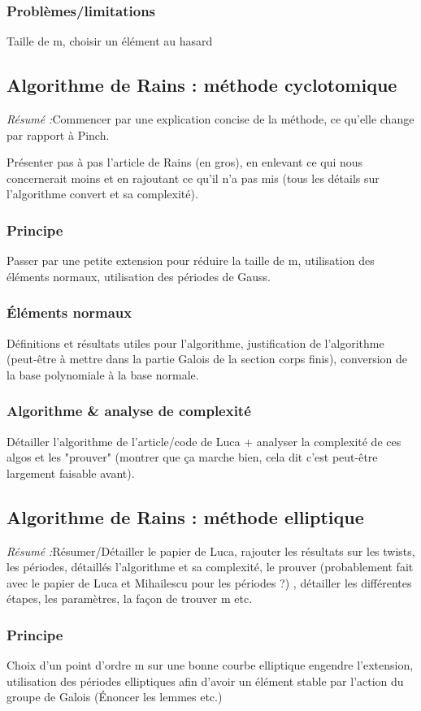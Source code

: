 \documentclass[a4paper]{article} %
\numberwithin{equation}{section}
\begin{document}
\subsubsection{Problèmes/limitations}
Taille de m, choisir un élément au hasard

\subsection{Algorithme de Rains : méthode cyclotomique}
\textit{Résumé :}Commencer par une explication concise de la méthode, ce 
qu'elle change par rapport à Pinch.\par
Présenter pas à pas l'article de Rains (en gros), en enlevant ce qui nous 
concernerait moins et en rajoutant ce qu'il n'a pas mis (tous les détails 
sur l'algorithme convert et sa complexité).
\subsubsection{Principe}
Passer par une petite extension pour réduire la taille de m, utilisation des
éléments normaux, utilisation des périodes de Gauss.
\subsubsection{Éléments normaux}
Définitions et résultats utiles pour l'algorithme, justification de
l'algorithme (peut-être à mettre dans la partie Galois de la section corps
finis), conversion de la base polynomiale à la base normale.
\subsubsection{Algorithme \& analyse de complexité}
Détailler l'algorithme de l'article/code de Luca + analyser la complexité de ces
algos et les "prouver" (montrer que ça marche bien, cela dit c'est peut-être
largement faisable avant).

\subsection{Algorithme de Rains : méthode elliptique}
\textit{Résumé :}Résumer/Détailler le papier de Luca, rajouter les résultats sur
les twists, les périodes, détaillés l'algorithme et sa complexité, le prouver 
(probablement fait avec le papier de Luca et Mihailescu pour les périodes ?)
, détailler les différentes étapes, les paramètres, la façon de trouver m 
etc.
\subsubsection{Principe}
Choix d'un point d'ordre m sur une bonne courbe elliptique engendre 
l'extension, utilisation des périodes elliptiques afin d'avoir un élément 
stable par l'action du groupe de Galois (Énoncer les lemmes etc.)
\end{document}
